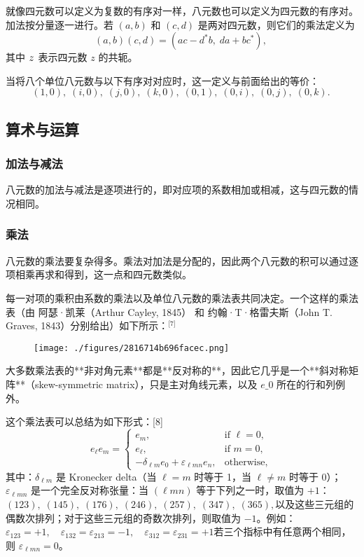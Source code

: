 就像四元数可以定义为复数的有序对一样，八元数也可以定义为四元数的有序对。加法按分量逐一进行。若 $(a, b)$ 和 $(c, d)$ 是两对四元数，则它们的乘法定义为
$$
(a, b)(c, d) = (ac - d^{*}b,\; da + bc^{*}),~
$$
其中 $z^{\*}$ 表示四元数 $z$ 的共轭。

当将八个单位八元数与以下有序对对应时，这一定义与前面给出的等价：
$$
(1, 0),\; (i, 0),\; (j, 0),\; (k, 0),\; (0, 1),\; (0, i),\; (0, j),\; (0, k).~
$$
\subsection{算术与运算}
\subsubsection{加法与减法}
八元数的加法与减法是逐项进行的，即对应项的系数相加或相减，这与四元数的情况相同。
\subsubsection{乘法}
八元数的乘法要复杂得多。乘法对加法是分配的，因此两个八元数的积可以通过逐项相乘再求和得到，这一点和四元数类似。

每一对项的乘积由系数的乘法以及单位八元数的乘法表共同决定。一个这样的乘法表（由 阿瑟·凯莱（Arthur Cayley, 1845） 和 约翰·T·格雷夫斯（John T. Graves, 1843）分别给出）如下所示：\(^\text{[7]}\)
\begin{figure}[ht]
\centering
\texttt{[image: ./figures/2816714b696facec.png]}
\caption{} \label{fig_BaYs_1}
\end{figure}
大多数乘法表的**非对角元素**都是**反对称的**，因此它几乎是一个**斜对称矩阵**（skew-symmetric matrix），只是主对角线元素，以及 $e\_{0}$ 所在的行和列例外。

这个乘法表可以总结为如下形式：[8]
$$
e_{\ell} e_{m} =
\begin{cases}
e_{m}, & \text{if } \ell = 0, \\
e_{\ell}, & \text{if } m = 0, \\
-\delta_{\ell m} e_{0} + \varepsilon_{\ell mn} e_{n}, & \text{otherwise},
\end{cases}~
$$
其中：$\delta_{\ell m}$ 是 Kronecker delta（当 $\ell = m$ 时等于 1，当 $\ell \neq m$ 时等于 0）；$\varepsilon_{\ell mn}$ 是一个完全反对称张量：当 $(\ell m n)$ 等于下列之一时，取值为 $+1$：$(123),\; (145),\; (176),\; (246),\; (257),\; (347),\; (365),$以及这些三元组的偶数次排列；对于这些三元组的奇数次排列，则取值为 $-1$。例如：$\varepsilon_{123} = +1, \quad 
\varepsilon_{132} = \varepsilon_{213} = -1, \quad\varepsilon_{312} = \varepsilon_{231} = +1$若三个指标中有任意两个相同，则 $\varepsilon_{\ell mn} = 0$。

